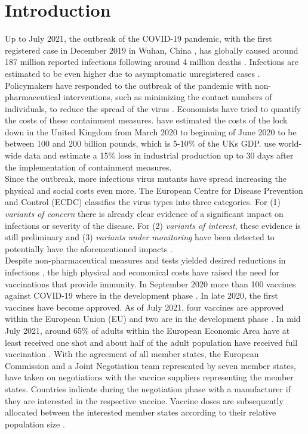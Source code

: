 \section{Introduction}
Up to July 2021, the outbreak of the COVID-19 pandemic, with the first registered case in December 2019 in Wuhan, China \citep{Hui.2020}, has globally caused around 187 million reported infections following around 4 million deaths \citep{ecdc.2021a}. Infections are estimated to be even higher due to asymptomatic unregistered cases \citep{Byambasuren.2020}. Policymakers have responded to the outbreak of the pandemic with non-pharmaceutical interventions, such as minimizing the contact numbers of individuals, to reduce the spread of the virus \citep{Gabler.2021}.  Economists have tried to quantify the costs of these containment measures. \cite{Miles.2020} have estimated the costs of the lock down in the United Kingdom from March 2020 to beginning of June 2020 to be between 100 and 200 billion pounds, which is 5-10\% of the UKs GDP. \cite{Deb.2020} use world-wide data and estimate a 15\% loss in industrial production up to 30 days after the implementation of containment measures. \\

Since the outbreak, more infectious virus mutants have spread increasing the physical and social costs even more. The European Centre for Disease Prevention and Control (ECDC) classifies the virus types into three categories. For (1) \textit{variants of concern} there is already clear evidence of a significant impact on infections or severity of the disease. For (2) \textit{variants of interest}, these evidence is still preliminary and (3) \textit{variants under monitoring} have been detected to potentially have the aforementioned impacts \citep{ecdc.2021b}. \\ 


Despite non-pharmaceutical measures and tests yielded desired reductions in infections \citep{Gabler.2021}, the high physical and economical costs have raised the need for vaccinations that provide immunity.
In September 2020 more than 100 vaccines against COVID-19 where in the development phase \citep{Mullard.2020}. In late 2020, the first vaccines have become approved. As of July 2021, four vaccines are approved within the European Union (EU) and two are in the development phase \citep{ECa.2021}. In mid July 2021, around 65\% of adults within the European Economic Area have at least received one shot and about half of the adult population have received full vaccination \citep{ecdc.2021a}. With the agreement of all member states, the European Commission and a Joint Negotiation team represented by seven member states, have taken on negotiations with the vaccine suppliers representing the member states. Countries indicate during the negotiation phase with a manufacturer if they are interested in the respective vaccine. Vaccine doses are subsequently allocated between the interested member states according to their relative population size \citep{ec.2021}. \\

